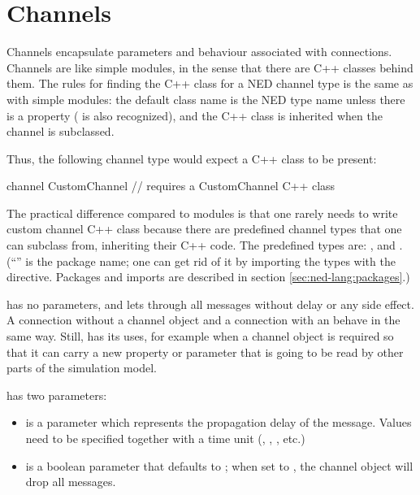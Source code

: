 \section{Channels}
\label{sec:ned-lang:channels}

Channels encapsulate parameters and behaviour associated with connections.
Channels are like simple modules, in the sense that there are C++ classes
behind them. The rules for finding the C++ class for a NED channel type is
the same as with simple modules: the default class name is the NED type
name unless there is a  property ( is also
recognized), and the C++ class is inherited when the channel is subclassed.

Thus, the following channel type would expect a  C++ class
to be present:

\begin{ned}
channel CustomChannel  // requires a CustomChannel C++ class
{
}
\end{ned}

The practical difference compared to modules is that one rarely needs to write
custom channel C++ class because there are predefined channel types that one can
subclass from, inheriting their C++ code. The predefined types are:
,  and .
(``'' is the package name; one can get rid of it by importing the types
with the  directive. Packages and imports are described in
section \ref{sec:ned-lang:packages}.)

 has no parameters, and lets through all messages without
delay or any side effect. A connection without a channel object
and a connection with an  behave in the same way.
Still,  has its uses, for example when a channel object
is required so that it can carry a new property or parameter that is
going to be read by other parts of the simulation model.

 has two parameters:

\begin{itemize}
    \item {} is a  parameter which represents the
          propagation delay of the message. Values need to be specified
          together with a time unit (, , , etc.)
    \item {} is a boolean parameter that defaults to ;
          when set to , the channel object will drop all messages.
\end{itemize}

